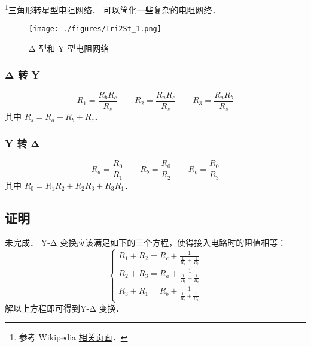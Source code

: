
\begin{issues}
\issueDraft
\end{issues}

\footnote{参考 Wikipedia \href{https://en.wikipedia.org/wiki/Y-Δ_transform}{相关页面}．}三角形转星型电阻网络． 可以简化一些复杂的电阻网络．

\begin{figure}[ht]
\centering
\texttt{[image: ./figures/Tri2St\_1.png]}
\caption{Δ 型和 Y 型电阻网络} \label{Tri2St_fig1}
\end{figure}

\subsubsection{Δ 转 Y}
\begin{equation}
R_1 = \frac{R_b R_c}{R_s} \qquad
R_2 = \frac{R_a R_c}{R_s} \qquad
R_3 = \frac{R_a R_b}{R_s}
\end{equation}
其中 $R_s = R_a + R_b + R_c$．

\subsubsection{Y 转 Δ}
\begin{equation}
R_a = \frac{R_0}{R_1} \qquad
R_b = \frac{R_0}{R_2} \qquad
R_c = \frac{R_0}{R_3}
\end{equation}
其中 $R_0 = R_1 R_2 + R_2 R_3 + R_3 R_1$．

\subsection{证明}
未完成．
Y-Δ 变换应该满足如下的三个方程，使得接入电路时的阻值相等：
\begin{equation}
\left\{\begin{matrix}R_1+R_2=R_c+\frac{1}{\frac{1}{R_a}+\frac{1}{R_b}}\\R_2+R_3=R_a+\frac{1}{\frac{1}{R_b}+\frac{1}{R_c}}\\R_3+R_1=R_b+\frac{1}{\frac{1}{R_c}+\frac{1}{R_a}}\end{matrix}\right.
\end{equation}
解以上方程即可得到Y-Δ 变换．